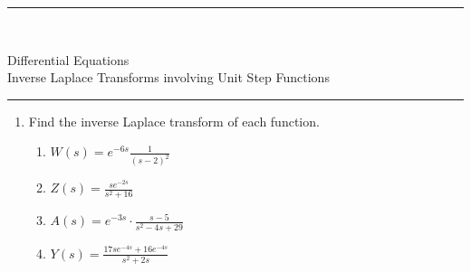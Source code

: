 \documentclass[12pt]{article}
\newcommand{\ben}{\begin{enumerate}}
\newcommand{\een}{\end{enumerate}}
\newcommand{\<}{\langle}
\renewcommand{\>}{\rangle}
\begin{document}
\noindent\rule{7in}{0.4pt}\\
\begin{center}
{\sc Differential Equations\\
Inverse Laplace Transforms involving Unit Step Functions}
\end{center}
\noindent\rule{7in}{0.4pt}

\ben
\item Find the inverse Laplace transform of each function.
	\ben

	\item	$\displaystyle W(s) = e^{-6s}\frac{1}{(s-2)^2}$\\
			\vfill
	\item	$\displaystyle Z(s) = \frac{se^{-2s}}{s^2 + 16}$\\
			 \vfill
					
\newpage

	\item	$\displaystyle A(s) = e^{-3s}\cdot \frac{s-5}{s^2 - 4s + 29}$\\
			 \vfill
	\item	$\displaystyle Y(s) = \frac{17se^{-4s} + 16e^{-4s}}{s^2 + 2s}$\\
			 \vfill
	\een


\een
\end{document}
